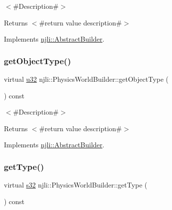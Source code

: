 $<$\#\+Description\#$>$

\begin{DoxyReturn}{Returns}
$<$\#return value description\#$>$ 
\end{DoxyReturn}


Implements \mbox{\hyperlink{classnjli_1_1_abstract_builder_a902f73ea78031b06aca183a417f3413b}{njli\+::\+Abstract\+Builder}}.

\mbox{\label{classnjli_1_1_physics_world_builder_a665a6db3345d1cfcdf2ea8cca2baa20e}} 
\subsubsection{\texorpdfstring{get\+Object\+Type()}{getObjectType()}}
{\footnotesize\ttfamily virtual \mbox{\hyperlink{_util_8h_a10e94b422ef0c20dcdec20d31a1f5049}{u32}} njli\+::\+Physics\+World\+Builder\+::get\+Object\+Type (\begin{DoxyParamCaption}{ }\end{DoxyParamCaption}) const\hspace{0.3cm}{\ttfamily [virtual]}}

$<$\#\+Description\#$>$

\begin{DoxyReturn}{Returns}
$<$\#return value description\#$>$ 
\end{DoxyReturn}


Implements \mbox{\hyperlink{classnjli_1_1_abstract_builder_a0f2d344fcf697b167f4f2b1122b5fb33}{njli\+::\+Abstract\+Builder}}.

\mbox{\label{classnjli_1_1_physics_world_builder_a0286fa01f8adc2fd7b71f6e3a2f0bb31}} 
\subsubsection{\texorpdfstring{get\+Type()}{getType()}}
{\footnotesize\ttfamily virtual \mbox{\hyperlink{_util_8h_aa62c75d314a0d1f37f79c4b73b2292e2}{s32}} njli\+::\+Physics\+World\+Builder\+::get\+Type (\begin{DoxyParamCaption}{ }\end{DoxyParamCaption}) const\hspace{0.3cm}{\ttfamily [virtual]}}

